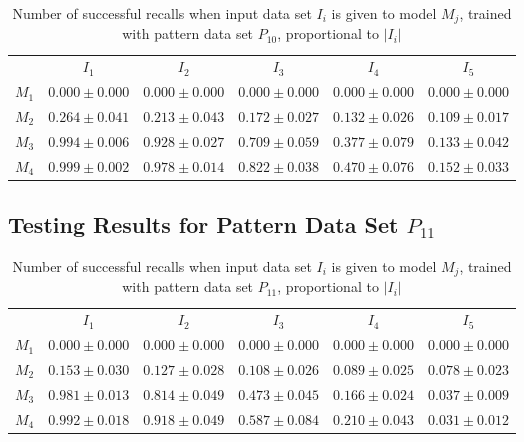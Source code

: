 \documentclass[anon]{CI}
\begin{document}
		\begin{table}[H]
			\centering
			\def\arraystretch{1.5}
			\footnotesize
			\begin{tabular}{cccccc}
				
				& $I_{1}$  & $I_{2}$  & $I_{3}$  & $I_{4}$  & $I_{5}$ \\ \cline{2-6}
				$M_{1}$  & $0.000\pm0.000$  & $0.000\pm0.000$  & $0.000\pm0.000$  & $0.000\pm0.000$  & $0.000\pm0.000$ \\
				$M_{2}$  & $0.264\pm0.041$  & $0.213\pm0.043$  & $0.172\pm0.027$  & $0.132\pm0.026$  & $0.109\pm0.017$ \\
				$M_{3}$  & $0.994\pm0.006$  & $0.928\pm0.027$  & $0.709\pm0.059$  & $0.377\pm0.079$  & $0.133\pm0.042$ \\
				$M_{4}$  & $0.999\pm0.002$  & $0.978\pm0.014$  & $0.822\pm0.038$  & $0.470\pm0.076$  & $0.152\pm0.033$ \\
				
			\end{tabular}
			\caption{Number of successful recalls when input data set $I_i$ is given to model $M_j$, trained with pattern data set $P_{10}$, proportional to $\left|I_i\right|$}
		\end{table}
		
		\subsection{Testing Results for Pattern Data Set $P_{11}$}
		
		
		\begin{table}[H]
			\centering
			\def\arraystretch{1.5}
			\footnotesize
			\begin{tabular}{cccccc}
				
				& $I_{1}$  & $I_{2}$  & $I_{3}$  & $I_{4}$  & $I_{5}$ \\ \cline{2-6}
				$M_{1}$  & $0.000\pm0.000$  & $0.000\pm0.000$  & $0.000\pm0.000$  & $0.000\pm0.000$  & $0.000\pm0.000$ \\
				$M_{2}$  & $0.153\pm0.030$  & $0.127\pm0.028$  & $0.108\pm0.026$  & $0.089\pm0.025$  & $0.078\pm0.023$ \\
				$M_{3}$  & $0.981\pm0.013$  & $0.814\pm0.049$  & $0.473\pm0.045$  & $0.166\pm0.024$  & $0.037\pm0.009$ \\
				$M_{4}$  & $0.992\pm0.018$  & $0.918\pm0.049$  & $0.587\pm0.084$  & $0.210\pm0.043$  & $0.031\pm0.012$ \\
				
			\end{tabular}
			\caption{Number of successful recalls when input data set $I_i$ is given to model $M_j$, trained with pattern data set $P_{11}$, proportional to $\left|I_i\right|$}
		\end{table}
		
\end{document}

